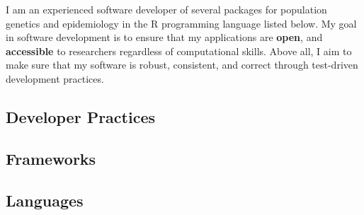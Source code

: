 
I am an experienced software developer of several packages for population
genetics and epidemiology in the R programming language listed below. My goal
in software development is to ensure that my applications are \textbf{open},
and \textbf{accessible} to researchers regardless of computational skills. Above
all, I aim to make sure that my software is robust, consistent, and correct
through test-driven development practices. 

\subsection{Developer Practices}


\subsection{Frameworks}


\subsection{Languages}

